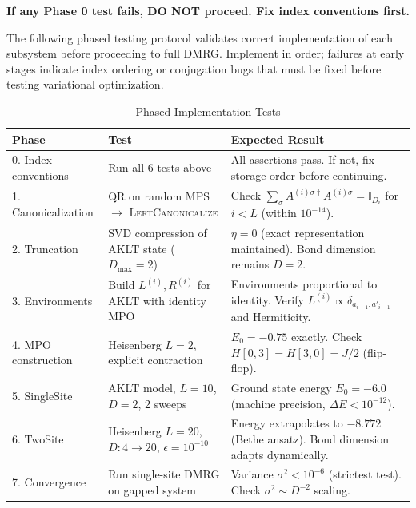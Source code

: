 \documentclass[aps,prb,onecolumn,scriptaddress]{revtex4-2}
\newcommand{\eps}{\epsilon}
\begin{document}
\textbf{If any Phase 0 test fails, DO NOT proceed. Fix index conventions first.}

\vspace{1em}

The following phased testing protocol validates correct implementation of each subsystem before proceeding to full DMRG. Implement in order; failures at early stages indicate index ordering or conjugation bugs that must be fixed before testing variational optimization.

\begin{table}[htbp]
	\centering
	\caption{Phased Implementation Tests}
	\label{tab:verification}
	\begin{tabularx}{\textwidth}{@{}l>{\raggedright\arraybackslash}p{3.5cm}X@{}}
		\toprule
		\textbf{Phase} & \textbf{Test} & \textbf{Expected Result} \\
		\midrule
		0. Index conventions & 
		Run all 6 tests above & 
		All assertions pass. If not, fix storage order before continuing. \\
		\midrule
		1. Canonicalization & 
		QR on random MPS $\to$ \textsc{LeftCanonicalize} & 
		Check $\sum_\sigma A^{(i)\sigma\dagger} A^{(i)\sigma} = \mathbb{I}_{D_i}$ for $i<L$ (within $10^{-14}$). \\
		\midrule
		2. Truncation & 
		SVD compression of AKLT state ($D_{\max}=2$) & 
		$\eta = 0$ (exact representation maintained). Bond dimension remains $D=2$. \\
		\midrule
		3. Environments & 
		Build $L^{(i)}, R^{(i)}$ for AKLT with identity MPO & 
		Environments proportional to identity. Verify $L^{(i)} \propto \delta_{a_{i-1},a'_{i-1}}$ and Hermiticity. \\
		\midrule
		4. MPO construction & 
		Heisenberg $L=2$, explicit contraction & 
		$E_0 = -0.75$ exactly. Check $H[0,3] = H[3,0] = J/2$ (flip-flop). \\
		\midrule
		5. SingleSite & 
		AKLT model, $L=10$, $D=2$, 2 sweeps & 
		Ground state energy $E_0 = -6.0$ (machine precision, $\Delta E < 10^{-12}$). \\
		\midrule
		6. TwoSite & 
		Heisenberg $L=20$, $D: 4\to20$, $\eps=10^{-10}$ & 
		Energy extrapolates to $-8.772$ (Bethe ansatz). Bond dimension adapts dynamically. \\
		\midrule
		7. Convergence & 
		Run single-site DMRG on gapped system & 
		Variance $\sigma^2 < 10^{-6}$ (strictest test). Check $\sigma^2 \sim D^{-2}$ scaling. \\
		\bottomrule
		\end{tabularx}
	\end{table}
\end{document}
